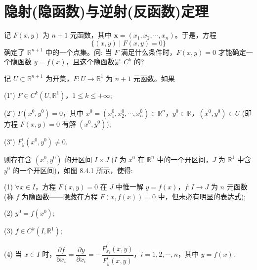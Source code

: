 \section{隐射(隐函数)与逆射(反函数)定理}\label{sec:8.4}

记 $F(x,y)$ 为 $n+1$ 元函数，其中 $\boldsymbol{x}=(x_{1},x_{2},\cdots,x_{n})$。于是，方程
\[
  \{(x,y) \mid F(x,y) = 0\}
\]
确定了 $\mathbb{R}^{n+1}$ 中的一个点集。问: 当 $F$ 满足什么条件时，$F(x,y)=0$ 才能确定一个隐函数 $y=f(x)$，且这个隐函数是 $C^{k}$ 的?

\begin{theorem}[隐函数存在定理]\label{thm:8.4.1}
记 $U \subset \mathbb{R}^{n+1}$ 为开集，$F: U \to \mathbb{R}^{1}$ 为 $n+1$ 元函数。如果

(1$^\circ$) $F \in C^{k}(U,\mathbb{R}^{1})$，$1 \leqslant k \leqslant +\infty$;

(2$^\circ$) $F(x^{0},y^{0}) = 0$，其中 $x^{0} = (x_{1}^{0},x_{2}^{0},\cdots,x_{n}^{0}) \in \mathbb{R}^{n}$，$y^{0} \in \mathbb{R}$，$(x^{0},y^{0}) \in U$ (即方程 $F(x,y) = 0$ 有解 $(x^{0},y^{0})$);

(3$^\circ$) $F_{y}^{\prime}(x^{0},y^{0}) \neq 0$.

则存在含 $(x^{0},y^{0})$ 的开区间 $I \times J$ ($I$ 为 $x^{0}$ 在 $\mathbb{R}^{n}$ 中的一个开区间，$J$ 为 $\mathbb{R}^{1}$ 中含 $y^{0}$ 的一个开区间)，如图 8.4.1 所示，使得:

(1) $\forall x \in I$，方程 $F(x,y) = 0$ 在 $J$ 中惟一解 $y = f(x)$，$f: I \to J$ 为 $n$ 元函数 (称 $f$ 为隐函数——隐藏在方程 $F(x,f(x)) = 0$ 中，但未必有明显的表达式);

(2) $y^{0} = f(x^{0})$;

(3) $f \in C^{k}(I,\mathbb{R}^{1})$;

(4) 当 $x \in I$ 时，$\dfrac{\partial f}{\partial x_{i}} = \dfrac{\partial y}{\partial x_{i}} = -\dfrac{F_{x_{i}}^{\prime}(x,y)}{F_{y}^{\prime}(x,y)}$，$i = 1,2,\cdots,n$，其中 $y = f(x)$.
\end{theorem}

